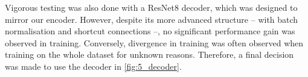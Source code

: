 Vigorous testing was also done with a ResNet8 decoder, which was designed to mirror our encoder. However, despite its more advanced structure -- with batch normalisation and shortcut connections --, no significant performance gain was observed in training. Conversely, divergence in training was often observed when training on the whole dataset for unknown reasons. Therefore, a final decision was made to use the decoder in \cref{fig:5_decoder}.